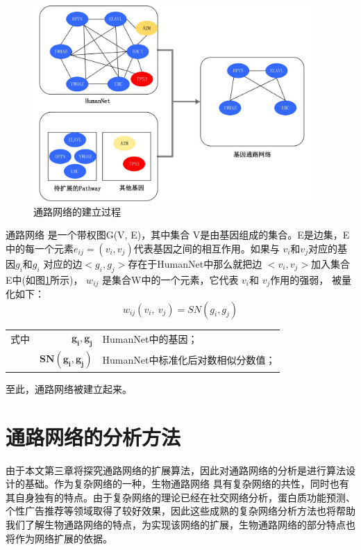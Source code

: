 \begin{figure}
\centering
\includegraphics[width = 0.95\textwidth]{pathway_cons}
\caption[fig21]{通路网络的建立过程}
\label{fig21}
\end{figure}
通路网络 是一个带权图G(V, E)，其中集合 V是由基因组成的集合。E是边集，E中的每一个元素$e_{ij}=(v_{i}, v_{j})$代表基因之间的相互作用。如果与 $v_{i}$和$v_{j}$对应的基因$g_{i}$和$g_{i}$ 对应的边$< g_{i} ,g_{j}  >$存在于HumanNet中那么就把边 $< v_{i} ,v_{j}  >$加入集合E中(如图\ref{fig21}所示)， $w_{ij}$ 是集合W中的一个元素，它代表 $v_{i}$和 $v_{j}$作用的强弱， 被量化如下：
\begin{equation}\label{eq22}
w_{ij} ( v_{i} ,\ v_{j}) =SN( g_{i} ,g_{j})
\end{equation}
\begin{tabularx}{\textwidth}{@{}l@{\quad}r@{———}X@{}}
式中 & $\boldsymbol{ g_{i}, g_{j}}$ &HumanNet中的基因；\\
	& $\boldsymbol{SN( g_{i} ,g_{j})}$ & HumanNet中标准化后对数相似分数值；\\
\end{tabularx}\vspace{3.15bp}
至此，通路网络被建立起来。


\section{ 通路网络的分析方法}
由于本文第三章将探究通路网络的扩展算法，因此对通路网络的分析是进行算法设计的基础。作为复杂网络的一种，生物通路网络
具有复杂网络的共性，同时也有其自身独有的特点。由于复杂网络的理论已经在社交网络分析，蛋白质功能预测、个性广告推荐等领域取得了较好效果，因此这些成熟的复杂网络分析方法也将帮助我们了解生物通路网络的特点，为实现该网络的扩展，生物通路网络的部分特点也将作为网络扩展的依据。

